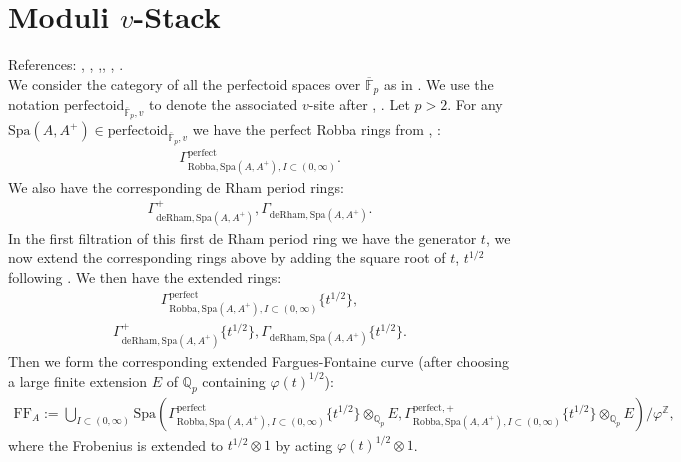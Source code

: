 \documentclass[12pt]{book}
\theoremstyle{definition}
\begin{document}
\newpage
\section{Moduli $v$-Stack}

\noindent References: \cite{FS}, \cite{FF}, \cite{Sch1},\cite{Sch2}, \cite{KL1}, \cite{KL2}.\\


\noindent We consider the category of all the perfectoid spaces over $\overline{\mathbb{F}}_p$ as in \cite{FS}. We use the notation $\text{perfectoid}_{\overline{\mathbb{F}}_p,v}$ to denote the associated $v$-site after \cite{FS}, \cite{Sch2}. Let $p>2$. For any $\mathrm{Spa}(A,A^+)\in \text{perfectoid}_{\overline{\mathbb{F}}_p,v}$ we have the perfect Robba rings from \cite{KL1}, \cite{KL2}:
\begin{align}
\Gamma^\text{perfect}_{\text{Robba},\mathrm{Spa}(A,A^+),I\subset (0,\infty)}.
\end{align}
We also have the corresponding de Rham period rings:
\begin{align}
\Gamma^+_{\text{deRham},\mathrm{Spa}(A,A^+)},\Gamma_{\text{deRham},\mathrm{Spa}(A,A^+)}.
\end{align}
In the first filtration of this first de Rham period ring we have the generator $t$, we now extend the corresponding rings above by adding the square root of $t$, $t^{1/2}
$ following \cite{BS}. We then have the extended rings:
\begin{align}
\Gamma^\text{perfect}_{\text{Robba},\mathrm{Spa}(A,A^+),I\subset (0,\infty)}\{t^{1/2}\},
\end{align}
\begin{align}
\Gamma^+_{\text{deRham},\mathrm{Spa}(A,A^+)}\{t^{1/2}\},\Gamma_{\text{deRham},\mathrm{Spa}(A,A^+)}\{t^{1/2}\}.
\end{align}
Then we form the corresponding extended Fargues-Fontaine curve (after choosing a large finite extension $E$ of $\mathbb{Q}_p$ containing $\varphi(t)^{1/2}$):
\begin{align}
\mathrm{FF}_A:=\bigcup_{I\subset (0,\infty)}\mathrm{Spa}(\Gamma^\text{perfect}_{\text{Robba},\mathrm{Spa}(A,A^+),I\subset (0,\infty)}\{t^{1/2}\}\otimes_{\mathbb{Q}_p}E,\Gamma^{\text{perfect},+}_{\text{Robba},\mathrm{Spa}(A,A^+),I\subset (0,\infty)}\{t^{1/2}\}\otimes_{\mathbb{Q}_p}E)/\varphi^\mathbb{Z},
\end{align}
where the Frobenius is extended to $t^{1/2}\otimes 1$ by acting $\varphi(t)^{1/2}\otimes 1$.
\end{document}
